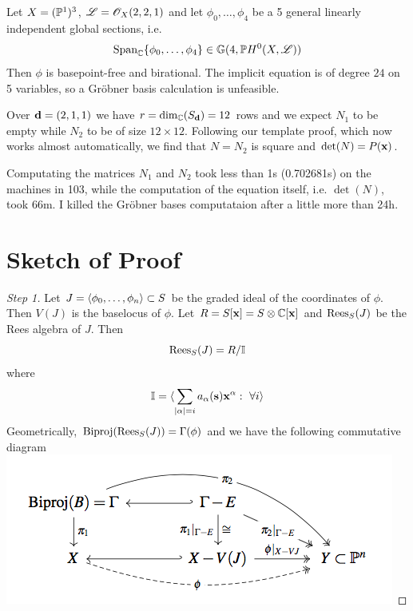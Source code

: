\documentclass[]{beamer}
\begin{document}
\begin{frame}
\begin{example}
	Let $X=(\mathbb{P}^1)^3$, $\mathscr{L}=\mathscr{O}_X(2,2,1)$
	and let $\phi_0,\ldots,\phi_4$ be a 5 general linearly independent global sections,
	i.e.
	\[
		\operatorname{Span}_{\mathbb{C}}\{\phi_0,\ldots,\phi_4\}\in\mathbb{G}(4,\mathbb{P} H^0(X,\mathscr{L}))
	\]
	Then $\phi$ is basepoint-free and birational.
	The implicit equation is of degree $24$ on 5 variables, so a Gr\"obner basis
	calculation is unfeasible.
	
	Over $\mathbf d=(2,1,1)$ we have $r=\dim_{\mathbb{C}}(S_\mathbf d)=12$ rows and we expect $N_1$ to be empty
	while $N_2$ to be of size $12\times12$.
	Following our template proof, which now works almost automatically,
	we find that $N=N_2$ is square and $\det(N)=P(\mathbf x)$.
\end{example}
\end{frame}

\begin{frame}
\begin{example}[cont]
	Computating the matrices $N_1$ and $N_2$ took less than 1s (0.702681s) on the machines in 103,
	while the computation of the equation itself, i.e. $\det(N)$, took 66m.
	I killed the Gr\"obner bases computataion after a little more than 24h.
\end{example}
\end{frame}



\section{Sketch of Proof}

\begin{frame}
\begin{proof}[Step 1]
	\def\qedsymbol{}
	Let $J=\langle \phi_0,\ldots,\phi_n\rangle\subset S$ be the graded ideal of the coordinates of $\phi$.
	Then $V(J)$ is the baselocus of $\phi$.
	Let $R=S[\mathbf x]=S\otimes \mathbb{C}[\mathbf x]$ and $\operatorname{Rees}_S(J)$ be the Rees algebra of $J$.
	Then
	\[
		\operatorname{Rees}_S(J)=R/\mathbb{I}
	\]
	where
	\[
		\mathbb{I}=\langle \sum_{|\alpha|=i} a_\alpha(\mathbf s){\mathbf x}^\alpha:~\forall i\rangle
	\]
	Geometrically, $\operatorname{Biproj}(\operatorname{Rees}_S(J))=\Gamma(\phi)$ and we have the following commutative diagram
	\includegraphics[scale=0.45]{graph.png}
\end{proof}
\end{frame}
\end{document}

